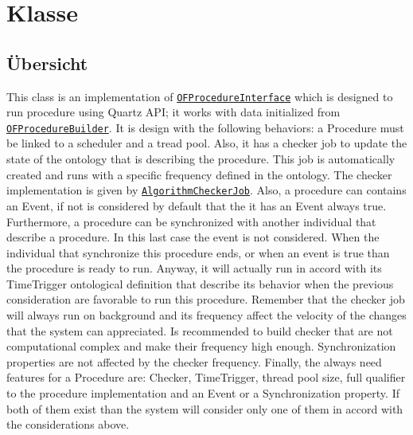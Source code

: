 
\section[Algorithm]{Klasse }\label{ontologyFramework.OFProcedureManagment.Algorithm-class}
\subsection{Übersicht}
This class is an implementation of \texttt{\hyperlink{ontologyFramework.OFProcedureManagment.OFProcedureInterface-class}{OFProcedureInterface}}
 which is designed to run procedure using Quartz API;
 it works with data initialized from \texttt{\hyperlink{ontologyFramework.OFProcedureManagment.OFProcedureBuilder-class}{OFProcedureBuilder}}.
 It is design with the following behaviors: a Procedure must be
 linked to a scheduler and a tread pool. Also, it has a 
 checker job to update the state of the ontology that
 is describing the procedure. This job is automatically created and
 runs with a specific frequency defined in the ontology. 
 The checker implementation is given by \texttt{\hyperlink{ontologyFramework.OFProcedureManagment.OFProcedureImplementation.AlgorithmCheckerJob-class}{AlgorithmCheckerJob}}.
 Also, a procedure can contains an Event, if not is considered by 
 default that the it has an Event always true. Furthermore, a procedure
 can be synchronized with another individual that describe a procedure.
 In this last case the event is not considered. When the individual
 that synchronize this procedure ends, or when an event is true
 than the procedure is ready to run. Anyway, it will actually run
 in accord with its TimeTrigger ontological definition that 
 describe its behavior when the previous consideration 
 are favorable to run this procedure. Remember that the checker
 job will always run on background and its frequency affect
 the velocity of the changes that the system can appreciated.
 Is recommended to build checker that are not computational
 complex and make their frequency high enough. Synchronization
 properties are not affected by the checker frequency. Finally,
 the always need features for a Procedure are: Checker, TimeTrigger,
 thread pool size, full qualifier to the procedure implementation
 and an Event or a Synchronization property. If both of them exist
 than the system will consider only one of them in accord with
 the considerations above.       
 
